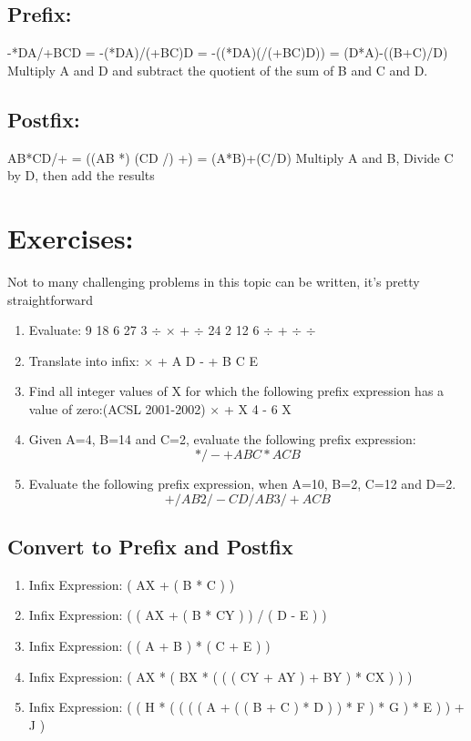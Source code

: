 \documentclass[11pt,letterpaper]{article}
\begin{document}
\subsection{Prefix:}
-*DA/+BCD = -(*DA)/(+BC)D = -((*DA)(/(+BC)D)) = (D*A)-((B+C)/D) Multiply A and D and subtract the quotient of the sum of B and C and D.

\subsection{Postfix:}
AB*CD/+ = ((AB *) (CD /) +) = (A*B)+(C/D)
Multiply A and B, Divide C by D, then add the results

\section{Exercises:}
Not to many challenging problems in this topic can be written, it's pretty straightforward

\begin{enumerate}

\item Evaluate: 9 18 6 27 3 $\div$ $\times$ + $\div$ 24 2 12 6 $\div$ + $\div$ $\div$

\item Translate into infix: $\times$ + A D - + B C E

\item Find all integer values of X for which the following prefix expression has
a value of zero:(ACSL 2001-2002) $\times$ + X 4 - 6 X 

\item Given A=4, B=14 and C=2, evaluate the following prefix expression: $$* / - + A B C * A C B$$

\item Evaluate the following prefix expression, when A=10, B=2, C=12 and D=2. $$+ / A B 2  / - C D / A B 3 / + AC B$$
\end{enumerate}

\subsection{Convert to Prefix and Postfix}
\label{sec:convert}

\begin{enumerate}
\item Infix Expression: ( AX + ( B * C ) ) 

\item Infix Expression: ( ( AX + ( B * CY ) ) / ( D - E ) )

\item Infix Expression: ( ( A + B ) * ( C + E ) ) 

\item Infix Expression: ( AX * ( BX * ( ( ( CY + AY ) + BY ) * CX ) ) ) 

\item Infix Expression: ( ( H * ( ( ( ( A + ( ( B + C ) * D ) ) * F ) * G ) * E ) ) + J )
\end{enumerate}
\end{document}

